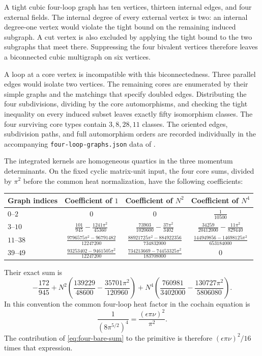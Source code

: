 A tight cubic four-loop graph has ten vertices, thirteen
internal edges, and four external fields. The internal degree
of every external vertex is two: an internal degree-one vertex
would violate the tight bound on the remaining induced
subgraph. A cut vertex is also excluded by applying the tight
bound to the two subgraphs that meet there. Suppressing the
four bivalent vertices therefore leaves a biconnected cubic
multigraph on six vertices.

A loop at a core vertex is incompatible with this
biconnectedness. Three parallel edges would isolate two
vertices. The remaining cores are enumerated by their simple
graphs and the matchings that specify doubled edges.
Distributing the four subdivisions, dividing by the core
automorphisms, and checking the tight inequality on every
induced subset leaves exactly fifty isomorphism classes.
The four surviving core types contain $3,8,28,11$ classes.
The oriented edges, subdivision paths, and full automorphism
orders are recorded individually in the accompanying
\texttt{four-loop-graphs.json} data of \cite{RepoHigher}.

The integrated kernels are homogeneous quartics in the three
momentum determinants. On the fixed cyclic matrix-unit input,
the four core sums, divided by $\pi^2$ before the common heat
normalization, have the following coefficients:
\begin{center}
\small
\renewcommand{\arraystretch}{2.1}
\setlength{\tabcolsep}{4pt}
\begin{tabular}{@{}lccc@{}}
\toprule
Graph indices & Coefficient of $1$ & Coefficient of $N^2$
  & Coefficient of $N^4$\\
\midrule
$0$--$2$ & $0$ & $0$ & $\frac1{10500}$\\
$3$--$10$
 & $\frac{101}{945}-\frac{1241\pi^2}{45360}$
 & $\frac{73903}{1020600}-\frac{37\pi^2}{3402}$
 & $\frac{34259}{20412000}-\frac{11\pi^2}{829440}$\\
$11$--$38$
 & $\frac{9796575\pi^2-96791482}{12247200}$
 & $\frac{88921725\pi^2-884922356}{734832000}$
 & $\frac{144949856-14698125\pi^2}{653184000}$\\
$39$--$49$
 & $\frac{93253402-9461505\pi^2}{12247200}$
 & $\frac{734213669-74453325\pi^2}{183708000}$
 & $0$\\
\bottomrule
\end{tabular}
\end{center}
Their exact sum is
\begin{equation}
 -\frac{172}{945}
 +N^2\left(\frac{139229}{48600}-\frac{35701\pi^2}{120960}\right)
 +N^4\left(\frac{760981}{3402000}
                       -\frac{130727\pi^2}{5806080}\right).
 \label{eq:four-bare-sum}
\end{equation}
In this convention the common four-loop heat factor in the
cochain equation is
\[
 \frac1{(8\pi^{5/2})^4}
       =\frac{(\epsilon\pi\nu)^2}{\pi^2}.
\]
The contribution of \eqref{eq:four-bare-sum} to the primitive
is therefore $(\epsilon\pi\nu)^2/16$ times that expression.

